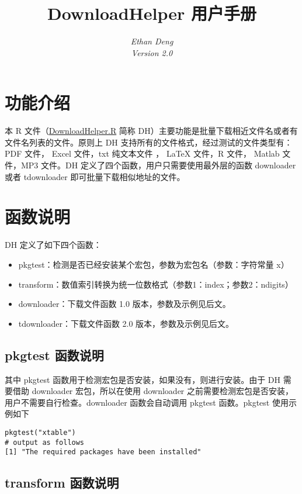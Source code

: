\documentclass{article}
\title{\bfseries{\color{blue}Download}{\color{magenta}Helper} 用户手册}
\author{\Large\gara\itshape{{\color{blue}E}than {\color{magenta}D}eng} \\ Version 2.0}
\begin{document}
\maketitle
\section{功能介绍}

本 R 文件（\href{http://stack.ddswhu.com/R/download/downloadhelper.R}{DownloadHelper.R} 简称 DH）主要功能是批量下载相近文件名或者有文件名列表的文件。原则上 DH 支持所有的文件格式，经过测试的文件类型有：\textsf{PDF} 文件， \textsf{Excel} 文件，\textsf{txt} 纯文本文件 ， \textsf{LaTeX} 文件，\textsf{R} 文件， \textsf{Matlab} 文件，\textsf{MP3} 文件。DH 定义了四个函数，用户只需要使用最外层的函数 downloader 或者 tdownloader 即可批量下载相似地址的文件。

\section{函数说明}

DH 定义了如下四个函数：

\begin{itemize}
    \item pkgtest：检测是否已经安装某个宏包，参数为宏包名（参数：字符常量 x）
    \item transform：数值索引转换为统一位数格式（参数1：index；参数2：ndigits）
    \item downloader：下载文件函数 1.0 版本，参数及示例见后文。
    \item tdownloader：下载文件函数 2.0 版本，参数及示例见后文。
\end{itemize}

\subsection{pkgtest 函数说明}

其中 \textsf{pkgtest} 函数用于检测宏包是否安装，如果没有，则进行安装。由于 DH 需要借助 \textsf{downloader} 宏包，所以在使用 \textsf{downloader} 之前需要检测宏包是否安装，用户不需要自行检查。\textsf{downloader} 函数会自动调用 \textsf{pkgtest} 函数。\textsf{pkgtest} 使用示例如下

\begin{lstlisting}
pkgtest("xtable")
# output as follows
[1] "The required packages have been installed"
\end{lstlisting}

\subsection{transform 函数说明}
\end{document}
